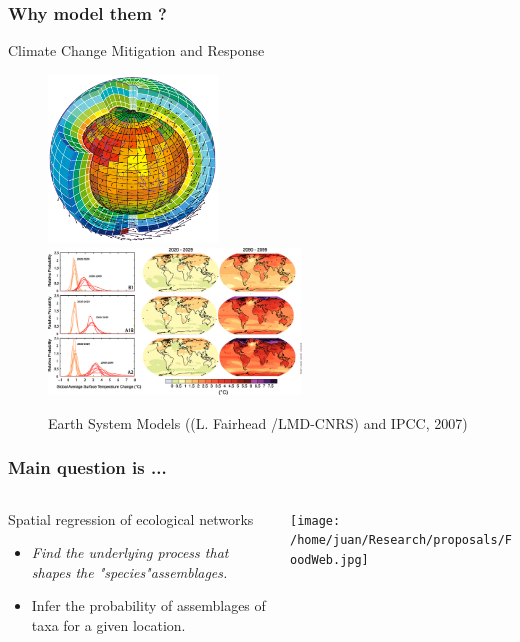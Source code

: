 \documentclass{beamer}
\begin{document}
	\begin{frame}
		\frametitle{Why model them ?}
		\begin{block}{Climate Change Mitigation and Response}
				\begin{figure}				
\centering
		    	\includegraphics[width=0.4\textwidth]{ESM.png}
		    	\includegraphics[width=0.6\textwidth]{ch1.png}		    	    
				\caption{Earth System Models ((L. Fairhead /LMD-CNRS) and IPCC, 2007)}
		    	\end{figure}
		\end{block}
	\end{frame}

	\begin{frame}
		\frametitle{Main question is ...}

				\begin{columns}
					\begin{column}{0.6\textwidth}
						\begin{block}{Spatial regression of ecological networks}						
						\begin{itemize}
						\item<1> {\em Find the underlying process that shapes the "species"assemblages.}
						\item<2> Infer the probability of assemblages of taxa for a given location.
						\end{itemize}										
					    \end{block}		
					\end{column}
				
			\begin{column}{0.5\textwidth}
			\centering
		    \texttt{[image: /home/juan/Research/proposals/FoodWeb.jpg]}		
		    \end{column}    	    
		\end{columns}
	\end{frame}
\end{document}
